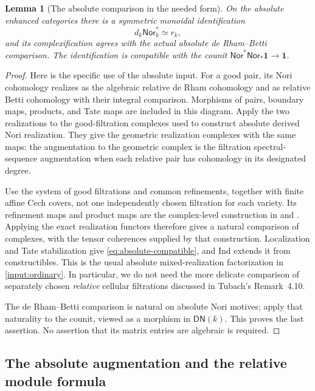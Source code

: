 \documentclass[11pt]{article}
\numberwithin{equation}{section}
\newtheorem{lemma}[lemma]{Lemma}
\theoremstyle{definition}
\theoremstyle{remark}
\newcommand{\one}{\mathbf1}
\begin{document}
\begin{lemma}[The absolute comparison in the needed form]
\label{lem:absolute-dR-comparison}
On the absolute enhanced categories there is a symmetric monoidal
identification
\begin{equation}\label{eq:absolute-compatible}
 d_k\mathsf{Nor}_k^*\simeq r_k,
\end{equation}
and its complexification agrees with the actual absolute de Rham--Betti
comparison. The identification is compatible with the counit
$\mathsf{Nor}^*\mathsf{Nor}_*\one\to\one$.
\end{lemma}
\begin{proof}
Here is the specific use of the absolute input. For a good pair, its
Nori cohomology realizes as the algebraic relative de Rham cohomology and
as relative Betti cohomology with their integral comparison. Morphisms of
pairs, boundary maps, products, and Tate maps are included in this diagram.
Apply the two realizations to the good-filtration complexes used to
construct absolute derived Nori realization. They give the geometric
realization complexes with the same maps: the augmentation to the
geometric complex is the filtration spectral-sequence augmentation when
each relative pair has cohomology in its designated degree.

Use the system of good filtrations and common refinements, together with
finite affine Cech covers, not one independently chosen filtration for
each variety. Its refinement maps and product maps are the complex-level
construction in \cite[\S7]{ChoudhuryGallauer} and
\cite[Chapters~4 and~7]{Harrer}. Applying the exact realization functors
therefore gives a natural comparison of complexes, with the tensor
coherences supplied by that construction. Localization and Tate
stabilization give \eqref{eq:absolute-compatible}, and Ind extends it
from constructibles. This is the usual absolute mixed-realization
factorization in \cref{input:ordinary}. In particular, we do not need the
more delicate comparison of separately chosen \emph{relative} cellular
filtrations discussed in Tubach's Remark~4.10.

The de Rham--Betti comparison is natural on absolute Nori motives; apply
that naturality to the counit, viewed as a morphism in $\mathsf{DN}(k)$.
This proves the last assertion. No assertion that its matrix entries are
algebraic is required.
\end{proof}

\subsection{The absolute augmentation and the relative module formula}
\end{document}
